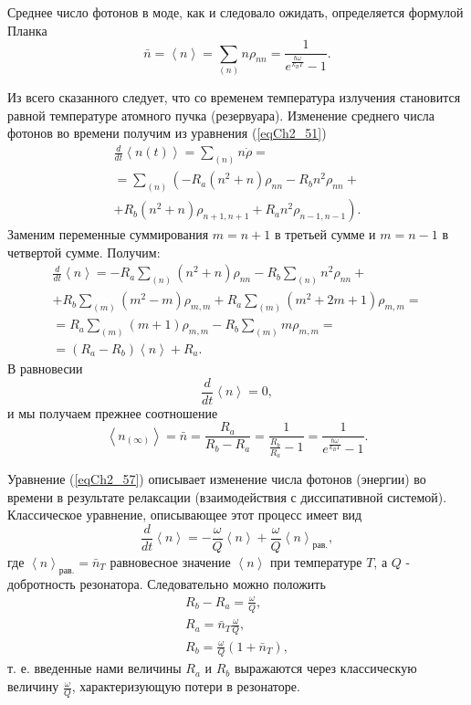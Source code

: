 Среднее число фотонов в моде, как и следовало ожидать, определяется
формулой Планка 
\begin{equation}
\bar{n} = \left<n\right> = 
\sum_{(n)} n \rho_{nn} = 
\frac{1}{ e^{\frac{\hbar \omega}{k_B T}} - 1}.
\end{equation}

Из всего сказанного следует, что со временем температура излучения
становится равной температуре атомного пучка (резервуара).  
Изменение среднего числа фотонов во времени получим из уравнения 
(\ref{eqCh2_51})
\begin{eqnarray}
\frac{d}{d t}\left<n\left(t\right)\right> = \sum_{(n)}n \dot{\rho} = 
\nonumber \\
= \sum_{(n)}\left(-R_a\left(n^2 + n\right)\rho_{nn} - R_b n^2
\rho_{nn} + \right.
\nonumber \\
+ \left.
R_b \left(n^2 + n\right) \rho_{n +1, n+ 1} +
R_a n^2 \rho_{n - 1, n - 1}
\right).
\end{eqnarray}
Заменим переменные суммирования  $m= n + 1$  в третьей сумме и  $m = n
- 1$  в четвертой сумме. Получим:
\begin{eqnarray}
\frac{d}{d t}\left<n\right> = 
-R_a \sum_{(n)}\left(n^2 + n\right)\rho_{nn}
 - R_b \sum_{(n)} n^2 \rho_{nn} +
\nonumber \\
+ R_b\sum_{(m)}\left(m^2 - m\right)\rho_{m,m} 
+ R_a\sum_{(m)}\left(m^2 +2 m + 1\right)\rho_{m,m} = 
\nonumber \\
= R_a \sum_{(m)}\left( m + 1\right)\rho_{m,m} - R_b\sum_{(m)} m
\rho_{m,m} =
\nonumber \\
= \left(R_a - R_b\right) \left<n\right> + R_a.
\label{eqCh2_57}
\end{eqnarray}
В равновесии
\[
\frac{d}{d t}\left<n\right> = 0,
\]  
и мы получаем прежнее соотношение
\begin{equation}
\left<n_{(\infty)}\right> = \bar{n} = 
\frac{R_a}{R_b - R_a} = \frac{1}{\frac{R_b}{R_a} - 1} = 
\frac{1}{e^{\frac{\hbar \omega}{k_B T}} - 1}.
\end{equation}

Уравнение (\ref{eqCh2_57}) описывает изменение числа фотонов (энергии)
во времени в результате релаксации (взаимодействия с диссипативной
системой). Классическое уравнение, описывающее этот процесс имеет вид
\begin{equation}
\frac{d}{d t}\left<n\right> = 
- \frac{\omega}{Q}\left<n\right> + \frac{\omega}{Q} \left<n\right>_{\mbox{рав.}},
\nonumber
\end{equation}
где $\left<n\right>_{\mbox{рав.}} = \bar{n}_T$ равновесное значение
$\left<n\right>$ при температуре $T$, а $Q$ - добротность резонатора.
Следовательно можно положить 
\begin{eqnarray}
R_b - R_a = \frac{\omega}{Q},
\nonumber \\
R_a = \bar{n}_T \frac{\omega}{Q},
\nonumber \\
R_b = \frac{\omega}{Q} \left(1 + \bar{n}_T\right),
\label{eqCh2_RabQw}
\end{eqnarray}
т. е. введенные нами величины $R_a$ и $R_b$ выражаются через
классическую величину $\frac{\omega}{Q}$, характеризующую потери в
резонаторе. 

